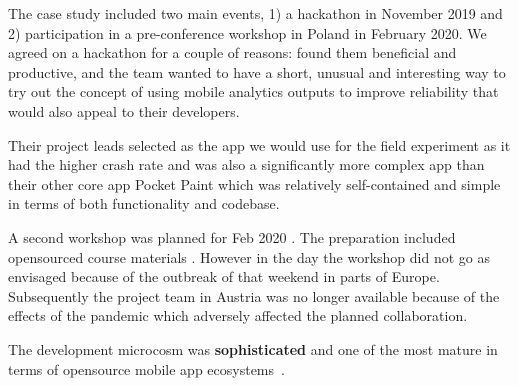 The case study included two main events, 1) a hackathon in November 2019 and 2) participation in a pre-conference workshop in Poland in February 2020. We agreed on a hackathon for a couple of reasons:  found them beneficial and productive, and the  team wanted to have a short, unusual and interesting way to try out the concept of using mobile analytics outputs to improve reliability that would also appeal to their developers. 

Their project leads selected  as the app we would use for the field experiment as it had the higher crash rate and was also a significantly more complex app than their other core app Pocket Paint which was relatively self-contained and simple in terms of both functionality and codebase.

A second workshop was planned for  Feb 2020 . The preparation included opensourced course materials . However in the day the workshop did not go as envisaged because of the outbreak of  that weekend in parts of Europe. Subsequently the project team in Austria was no longer available because of the effects of the pandemic which adversely affected the planned collaboration.

The development microcosm was \textbf{sophisticated} and one of the most mature in terms of opensource mobile app ecosystems~.  %

